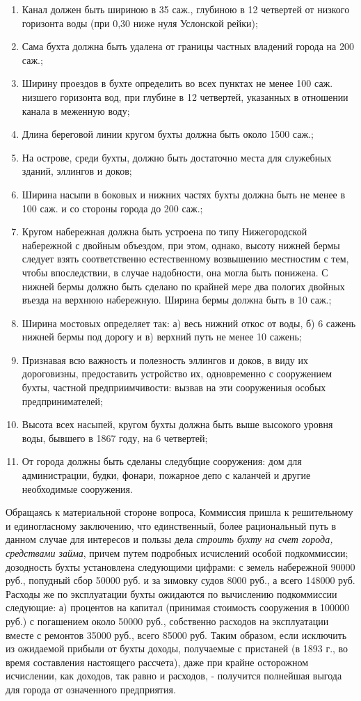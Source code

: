 \documentclass[oneside,final,14pt]{extreport}
\begin{document}
\begin{enumerate} 
	\item Канал должен быть шириною в 35 саж., глубиною в 12 четвертей от низкого горизонта воды (при 0,30 ниже нуля Услонской рейки);
	\item Сама бухта должна быть удалена от границы частных владений города на 200 саж.;
	\item Ширину проездов в бухте определить во всех пунктах не менее 100 саж. низшего горизонта вод, при глубине в 12 четвертей, указанных в отношении канала в меженную воду;
	\item Длина береговой линии кругом бухты должна быть около 1500 саж.;
	\item На острове, среди бухты, должно быть достаточно места для служебных зданий, эллингов и доков;
	\item Ширина насыпи в боковых и нижних частях бухты должна быть не менее в 100 саж. и со стороны города до 200 саж.;
	\item Кругом набережная должна быть устроена по типу Нижегородской набережной с двойным объездом, при этом, однако, высоту нижней бермы следует взять соответственно естественному возвышению местностим с тем, чтобы впоследствии, в случае надобности, она могла быть понижена. С нижней бермы должно быть сделано по крайней мере два пологих двойных въезда на верхнюю набережную. Ширина бермы должна быть в 10 саж.;
	\item  Ширина мостовых определяет так: а) весь нижний откос от воды, б) 6 сажень нижней бермы под дорогу и в) верхний путь не менее 10 сажень;
	\item Признавая всю важность и полезность эллингов и доков, в виду их дороговизны, предоставить устройство их, одновременно с сооружением бухты, частной предприимчивости: вызвав на эти сооружениыя особых предпринимателей;
	\item Высота всех насыпей, кругом бухты должна быть выше высокого уровня воды, бывшего в 1867 году, на 6 четвертей;
	\item От города должны быть сделаны следубщие сооружения: дом для администрации, будки, фонари, пожарное депо с каланчей и другие необходимые сооружения.
\end{enumerate}

Обращаясь к материальной стороне вопроса, Коммиссия пришла к решительному и единогласному заключению, что единственный, более рациональный путь в данном случае для интересов и пользы дела {\it строить бухту на счет города, средствами займа}, причем путем подробных исчислений особой подкоммиссии; дозодность бухты установлена следующими цифрами: с земель набережной 90000 руб., попудный сбор 50000 руб. и за зимовку судов 8000 руб., а всего 148000 руб. Расходы же по эксплуатации бухты ожидаются по вычислению подкоммиссии следующие: а) процентов на капитал (принимая стоимость сооружения в 100000 руб.) с погашением около 50000 руб., собственно расходов на эксплуатации вместе с ремонтов 35000 руб., всего 85000 руб. Таким образом, если исключить из ожидаемой прибыли от бухты доходы, получаемые с пристаней (в 1893 г., во время составления настоящего рассчета), даже при крайне осторожном исчислении, как доходов, так равно и расходов, - получится полнейшая выгода для города от означенного предприятия.
\end{document}
